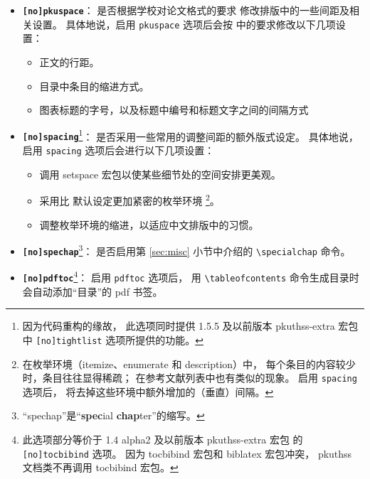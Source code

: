 \begin{itemize}
    \item \textbf{\texttt{[no]pkuspace}}：
        是否根据学校对论文格式的要求\cite{pku-thesisstyle}%
        修改排版中的一些间距及相关设置。
        具体地说，启用 \verb|pkuspace| 选项后会按
        \parencite{pku-thesisstyle} 中的要求修改以下几项设置：
    \begin{itemize}
        \item 正文的行距。
        \item 目录中条目的缩进方式。
        \item 图表标题的字号，以及标题中编号和标题文字之间的间隔方式
    \end{itemize}

    \item \textbf{\texttt{[no]spacing}}\footnote{%
            因为代码重构的缘故，
            此选项同时提供 1.5.5 及以前版本 pkuthss-extra 宏包
            中 \texttt{[no]tightlist} 选项所提供的功能。%
        }：
        是否采用一些常用的调整间距的额外版式设定。
        具体地说，启用 \verb|spacing| 选项后会进行以下几项设置：
    \begin{itemize}
        \item 调用 setspace 宏包以使某些细节处的空间安排更美观。
        \item 采用比  默认设定更加紧密的枚举环境%
            \footnote{%
                在枚举环境（itemize、enumerate 和 description）中，
                每个条目的内容较少时，条目往往显得稀疏；
                在参考文献列表中也有类似的现象。
                启用 \texttt{spacing} 选项后，
                将去掉这些环境中额外增加的（垂直）间隔。%
            }。
        \item 调整枚举环境的缩进，以适应中文排版中的习惯。
    \end{itemize}

    \item \textbf{\texttt{[no]spechap}}\footnote{%
            “spechap”是“\textbf{spec}ial \textbf{chap}ter”的缩写。%
        }：
        是否启用第 \ref{sec:misc} 小节中介绍的 \verb|\specialchap| 命令。

    \item \textbf{\texttt{[no]pdftoc}}\footnote{%
            此选项部分等价于 1.4 alpha2 及以前版本 pkuthss-extra 宏包
            的 \texttt{[no]tocbibind} 选项。
            因为 tocbibind 宏包和 biblatex 宏包冲突，%
            pkuthss 文档类不再调用 tocbibind 宏包。%
        }：
        启用 \verb|pdftoc| 选项后，
        用 \verb|\tableofcontents| 命令生成目录时会自动添加“目录”的 pdf 书签。


\end{itemize}

